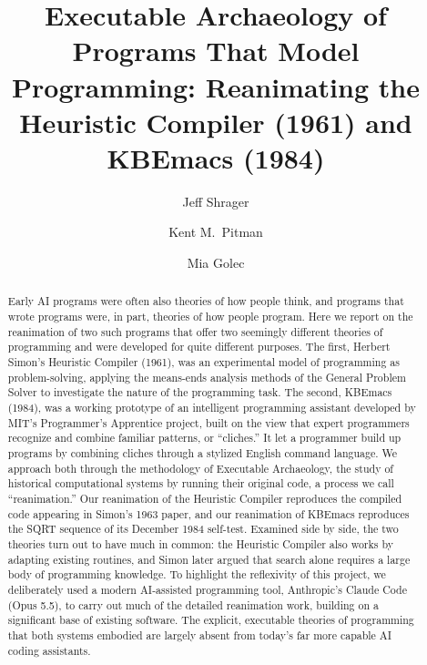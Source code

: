 \documentclass[11pt]{article}
\begin{document}
\title{Executable Archaeology of Programs That Model Programming: Reanimating the Heuristic Compiler (1961) and KBEmacs (1984)}

\author[1]{Jeff Shrager}
\author[2]{Kent M.~Pitman}
\author[3]{Mia Golec}
\date{}

\maketitle

\begin{abstract}

Early AI programs were often also theories of how people think, and
programs that wrote programs were, in part, theories of how people
program. Here we report on the reanimation of two such programs that
offer two seemingly different theories of programming and were developed for
quite different purposes. The first, Herbert Simon's Heuristic
Compiler (1961), was an experimental model of programming as
problem-solving, applying the means-ends analysis methods of the
General Problem Solver to investigate the nature of the programming
task. The second, KBEmacs (1984), was a working prototype of an
intelligent programming assistant developed by MIT's Programmer's
Apprentice project, built on the view that expert programmers
recognize and combine familiar patterns, or ``cliches.''  It let a
programmer build up programs by combining cliches through a stylized
English command language. We approach both through the methodology of
Executable Archaeology, the study of historical computational systems
by running their original code, a process we call ``reanimation.'' Our
reanimation of the Heuristic Compiler reproduces the compiled code
appearing in Simon's 1963 paper, and our reanimation of KBEmacs
reproduces the SQRT sequence of its December 1984 self-test.
Examined side by side, the two theories turn out to have much in
common: the Heuristic Compiler also works by adapting existing
routines, and Simon later argued that search alone requires a large
body of programming knowledge. To
highlight the reflexivity of this project, we deliberately used a
modern AI-assisted programming tool, Anthropic's Claude Code (Opus
5.5), to carry out much of the detailed reanimation work, building on
a significant base of existing software. The
explicit, executable theories of programming that both systems
embodied are largely absent from today's far more capable AI coding
assistants.

\end{abstract}
\end{document}
